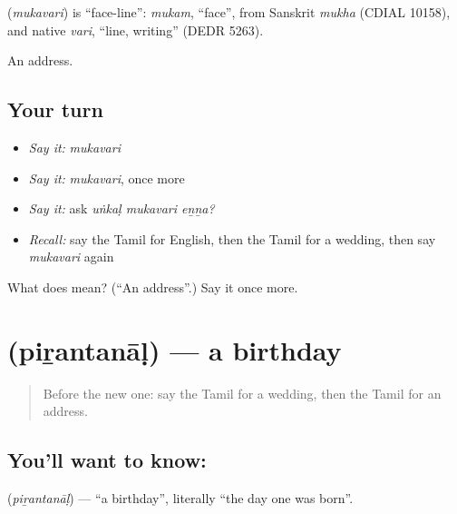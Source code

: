 \begin{cousinweb}
\textbf{} (\emph{mukavari}) is \textquotedblleft{}face-line\textquotedblright{}: \emph{mukam}, \textquotedblleft{}face\textquotedblright{}, from Sanskrit \emph{mukha} (CDIAL 10158), and native \emph{vari}, \textquotedblleft{}line, writing\textquotedblright{} (DEDR 5263).
\end{cousinweb}

\begin{grammarlens}[title={What you've built}]
An address.
\end{grammarlens}

\subsection*{Your turn}
\begin{itemize}
\raggedright
  \item \emph{Say it:} \emph{mukavari}
  \item \emph{Say it:} \emph{mukavari}, once more
  \item \emph{Say it:} ask \emph{uṅkaḷ mukavari eṉṉa?}
  \item \emph{Recall:} say the Tamil for English, then the Tamil for a wedding, then say \emph{mukavari} again
\end{itemize}

\begin{tcolorbox}[breakable,colback=teal!4,colframe=teal!35!black,title={Before you move on}]
What does  mean? (\textquotedblleft{}An address\textquotedblright{}.) Say it once more.
\end{tcolorbox}
\section[\texorpdfstring{\ta{பிறந்தநாள்} (piṟantanāḷ)}{பிறந்தநாள் (piṟantanāḷ)}]{ (piṟantanāḷ) — a birthday}

\label{lesson:TA-C104-birthday}



\begin{quote}
Before the new one: say the Tamil for a wedding, then the Tamil for an address.
\end{quote}

\subsection*{You'll want to know: }
\textbf{} (\emph{piṟantanāḷ}) — \textquotedblleft{}a birthday\textquotedblright{}, literally \textquotedblleft{}the day one was born\textquotedblright{}.

